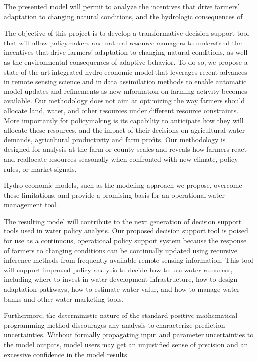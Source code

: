 The presented model will permit to analyze the incentives that drive farmers' adaptation to changing natural conditions, and the hydrologic consequences of 



The objective of this project is to develop a transformative decision support tool that will allow policymakers and natural resource managers to understand the incentives that drive farmers’ adaptation to changing natural conditions, as well as the environmental consequences of adaptive behavior.  To do so, we propose a state-of-the-art integrated hydro-economic model that leverages recent advances in remote sensing science and in data assimilation methods to enable automatic model updates and refinements as new information on farming activity becomes available. Our methodology does not aim at optimizing the way farmers should allocate land, water, and other resources under different resource constraints. More importantly for policymaking is its capability to anticipate how they will allocate these resources, and the impact of their decisions on agricultural water demands, agricultural productivity and farm profits. Our methodology is designed for analysis at the farm or county scales and reveals how farmers react and reallocate resources seasonally when confronted with new climate, policy rules, or market signals. 

Hydro-economic models, such as the modeling approach we propose, overcome these limitations, and provide a promising basis for an operational water management tool. 

 





 The resulting model will contribute to the next generation of decision support tools used in water policy analysis. Our proposed decision support tool is poised for use as a continuous, operational policy support system because the response of farmers to changing conditions can be continually updated using recursive inference methods from frequently available remote sensing information. This tool will support improved policy analysis to decide how to use water resources, including where to invest in water development infrastructure, how to design adaptation pathways, how to estimate water value, and how to manage water banks and other water marketing tools.
 
 
 
 
 Furthermore, the deterministic nature of the standard positive mathematical programming method discourages any analysis to characterize prediction uncertainties. Without formally propagating input and parameter uncertainties to the model outputs, model users may get an unjustified sense of precision and an excessive confidence in the model results. 
 
 
